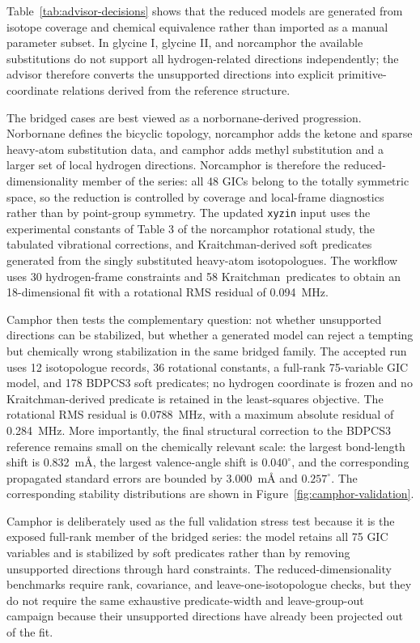 \documentclass[aip,jcp,reprint,longbibliography,floatfix]{revtex4-2}
\begin{document}
Table~\ref{tab:advisor-decisions} shows that the reduced models are generated
from isotope coverage and chemical equivalence rather than imported as a
manual parameter subset. In glycine I, glycine II, and norcamphor the available
substitutions do not support all hydrogen-related directions independently;
the advisor therefore converts the unsupported directions into explicit
primitive-coordinate relations derived from the reference structure.

The bridged cases are best viewed as a norbornane-derived progression.
Norbornane defines the bicyclic topology, norcamphor adds the ketone and
sparse heavy-atom substitution data, and camphor adds methyl substitution and
a larger set of local hydrogen directions. Norcamphor is therefore the
reduced-dimensionality member of the series: all 48 GICs belong to the
totally symmetric space, so the reduction is controlled by coverage and
local-frame diagnostics rather than by point-group symmetry. The updated
\texttt{xyzin} input uses the experimental constants of Table 3 of the
norcamphor rotational study, the tabulated vibrational corrections, and
Kraitchman-derived soft predicates generated from the singly substituted
heavy-atom isotopologues. The workflow uses 30 hydrogen-frame constraints and
58 \mbox{Kraitchman predicates} to obtain an 18-dimensional fit with a
rotational RMS residual of 0.094~MHz.

Camphor then tests the complementary question: not whether unsupported
directions can be stabilized, but whether a generated model can reject a
tempting but chemically wrong stabilization in the same bridged family. The
accepted run uses 12 isotopologue records, 36 rotational constants, a
full-rank 75-variable GIC model, and 178 BDPCS3 soft predicates; no hydrogen
coordinate is frozen and no Kraitchman-derived predicate is retained in the
least-squares objective. The rotational RMS residual is 0.0788~MHz, with a
maximum absolute residual of 0.284~MHz. More importantly, the final structural
correction to the BDPCS3 reference remains small on the chemically relevant
scale: the largest bond-length shift is 0.832~m\AA{}, the largest
valence-angle shift is $0.040^\circ$, and the corresponding propagated
standard errors are bounded by 3.000~m\AA{} and $0.257^\circ$. The
corresponding stability distributions are shown in
Figure~\ref{fig:camphor-validation}.

Camphor is deliberately used as the full validation stress test because it is
the exposed full-rank member of the bridged series: the model retains all 75
GIC variables and is stabilized by soft predicates rather than by removing
unsupported directions through hard constraints. The reduced-dimensionality
benchmarks require rank, covariance, and leave-one-isotopologue checks, but
they do not require the same exhaustive predicate-width and leave-group-out
campaign because their unsupported directions have already been projected out
of the fit.
\end{document}
